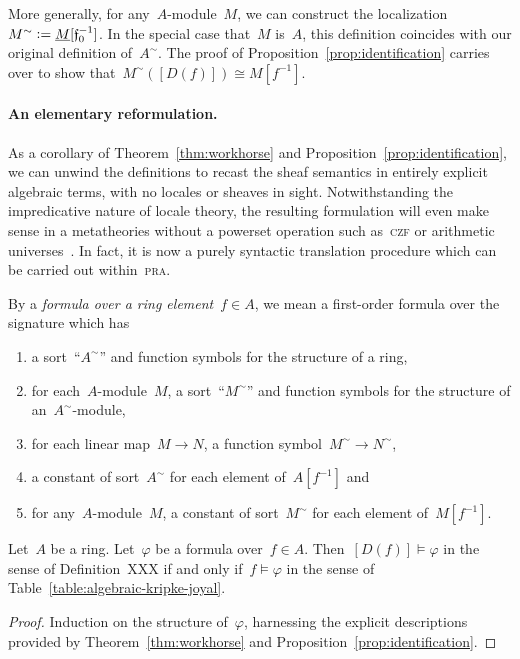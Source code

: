 \documentclass{ws-rv9x6}
\newcommand{\fff}{\mathfrak{f}}
\newcommand{\defeq}{\vcentcolon=}
\renewcommand{\_}{\mathpunct{.}}
\newcommand{\?}{\,{:}\,}
\begin{document}
More generally, for any~$A$-module~$M$, we can construct the
localization~$M^\sim \defeq \underline{M}[\fff_0^{-1}]$. In the special case
that~$M$ is~$A$, this definition coincides with our original definition
of~$A^\sim$. The proof of Proposition~\ref{prop:identification} carries over to
show that~$M^\sim([D(f)]) \cong M[f^{-1}]$.

\paragraph{An elementary reformulation.}
As a corollary of Theorem~\ref{thm:workhorse} and
Proposition~\ref{prop:identification}, we can unwind the definitions to recast
the sheaf semantics in entirely explicit algebraic terms, with no locales or
sheaves in sight. Notwithstanding the impredicative nature of locale theory,
the resulting formulation will even make sense in a metatheories without a
powerset operation such as~\textsc{czf} or arithmetic universes~\cite{XXX}. In
fact, it is now a purely syntactic translation procedure which can be carried
out within~\textsc{pra}.

By a \emph{formula over a ring element}~$f \in A$, we mean a
first-order formula over the signature which has
\begin{enumerate}
\item a sort~``$A^\sim$'' and function symbols for the structure of a ring,
\item for each~$A$-module~$M$, a sort~``$M^\sim$'' and function symbols for the
structure of an~$A^\sim$-module,
\item for each linear map~$M \to N$, a function symbol~$M^\sim \to N^\sim$,
\item a constant of sort~$A^\sim$ for each element of~$A[f^{-1}]$ and
\item for any~$A$-module~$M$, a constant of sort~$M^\sim$ for each element of~$M[f^{-1}]$.
\end{enumerate}

\begin{corollary}\label{cor:algebraic-reformulation}
Let~$A$ be a ring. Let~$\varphi$ be a formula over~$f \in A$.
Then~$[D(f)] \models \varphi$ in the sense of Definition~XXX if and only
if~$f \models \varphi$ in the sense of Table~\ref{table:algebraic-kripke-joyal}.
\end{corollary}

\begin{proof}Induction on the structure of~$\varphi$, harnessing the explicit
descriptions provided by Theorem~\ref{thm:workhorse} and
Proposition~\ref{prop:identification}.\end{proof}
\end{document}
